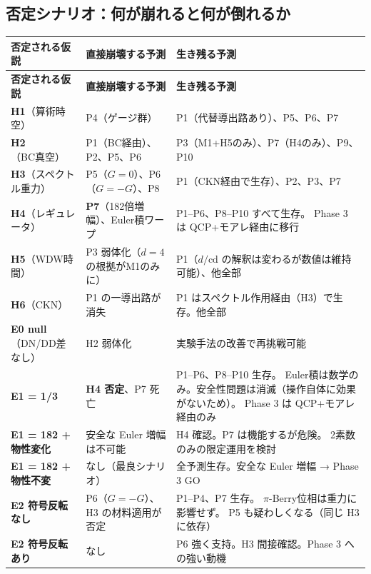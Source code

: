\subsection*{否定シナリオ：何が崩れると何が倒れるか}

\begin{center}
\renewcommand{\arraystretch}{1.4}
\begin{longtable}{p{3.5cm}p{5cm}p{5.5cm}}
\toprule
\textbf{否定される仮説} & \textbf{直接崩壊する予測} & \textbf{生き残る予測} \\
\midrule
\endfirsthead
\toprule
\textbf{否定される仮説} & \textbf{直接崩壊する予測} & \textbf{生き残る予測} \\
\midrule
\endhead

\textbf{H1}（算術時空） &
P4（ゲージ群） &
P1（代替導出路あり）、P5、P6、P7 \\

\textbf{H2}（BC真空） &
P1（BC経由）、P2、P5、P6 &
P3（M1+H5のみ）、P7（H4のみ）、P9、P10 \\

\textbf{H3}（スペクトル重力） &
P5（$G=0$）、P6（$G=-G$）、P8 &
P1（CKN経由で生存）、P2、P3、P7 \\

\textbf{H4}（レギュレータ） &
\textbf{P7}（182倍増幅）、Euler積ワープ &
P1--P6、P8--P10 すべて生存。
Phase 3 は QCP+モアレ経由に移行 \\

\textbf{H5}（WDW時間） &
P3 弱体化（$d=4$ の根拠がM1のみに） &
P1（$d/\mathrm{cd}$ の解釈は変わるが数値は維持可能）、他全部 \\

\textbf{H6}（CKN） &
P1 の一導出路が消失 &
P1 はスペクトル作用経由（H3）で生存。他全部 \\
\midrule

\textbf{E0 null}（DN/DD差なし） &
H2 弱体化 &
実験手法の改善で再挑戦可能 \\

\textbf{E1 = 1/3} &
\textbf{H4 否定}、P7 死亡 &
P1--P6、P8--P10 生存。
Euler積は数学のみ。安全性問題は消滅（操作自体に効果がないため）。
Phase 3 は QCP+モアレ経由のみ \\

\textbf{E1 = 182 + 物性変化} &
安全な Euler 増幅は不可能 &
H4 確認。P7 は機能するが危険。
2素数のみの限定運用を検討 \\

\textbf{E1 = 182 + 物性不変} &
なし（最良シナリオ） &
全予測生存。安全な Euler 増幅 → Phase 3 GO \\

\textbf{E2 符号反転なし} &
P6（$G=-G$）、H3 の材料適用が否定 &
P1--P4、P7 生存。
$\pi$-Berry位相は重力に影響せず。
P5 も疑わしくなる（同じ H3 に依存） \\

\textbf{E2 符号反転あり} &
なし &
P6 強く支持。H3 間接確認。Phase 3 への強い動機 \\

\bottomrule
\end{longtable}
\end{center}

